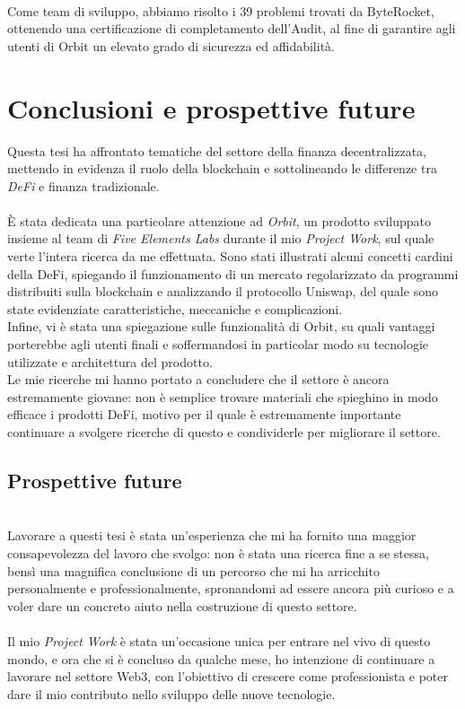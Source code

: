 \documentclass[12pt,a4paper]{report}
\begin{document}
\noindent \\Come team di sviluppo, abbiamo risolto i 39 problemi trovati da ByteRocket, ottenendo una certificazione di completamento dell'Audit, al fine di garantire agli utenti di Orbit un elevato grado di sicurezza ed affidabilità.


\chapter{Conclusioni e prospettive future}

Questa tesi ha affrontato tematiche del settore della finanza decentralizzata, mettendo in evidenza il ruolo della blockchain e sottolineando le differenze tra \textit{DeFi} e finanza tradizionale.\\\\È stata dedicata una particolare attenzione ad \textit{Orbit}, un prodotto sviluppato insieme al team di \textit{Five Elements Labs} durante il mio \textit{Project Work}, sul quale verte l'intera ricerca da me effettuata. Sono stati illustrati alcuni concetti cardini della DeFi, spiegando il funzionamento di un mercato regolarizzato da programmi distribuiti sulla blockchain e analizzando il protocollo Uniswap, del quale sono state evidenziate caratteristiche, meccaniche e complicazioni.
\\Infine, vi è stata una spiegazione sulle funzionalità di Orbit, su quali vantaggi porterebbe agli utenti finali e soffermandosi in particolar modo su tecnologie utilizzate e architettura del prodotto.
\\Le mie ricerche mi hanno portato a concludere che il settore è ancora estremamente giovane: non è semplice trovare materiali che spieghino in modo efficace i prodotti DeFi, motivo per il quale è estremamente importante continuare a svolgere ricerche di questo e condividerle per migliorare il settore.

\section{Prospettive future}
\\Lavorare a questi tesi è stata un'esperienza che mi ha fornito una maggior consapevolezza del lavoro che svolgo: non è stata una ricerca fine a se stessa, bensì una magnifica conclusione di un percorso che mi ha arricchito personalmente e professionalmente, spronandomi ad essere ancora più curioso e a voler dare un concreto aiuto nella costruzione di questo settore.
\\\\Il mio \textit{Project Work} è stata un'occasione unica per entrare nel vivo di questo mondo, e ora che si è concluso da qualche mese, ho intenzione di continuare a lavorare nel settore Web3, con l'obiettivo di crescere come professionista e poter dare il mio contributo nello sviluppo delle nuove tecnologie.


\nocite{mastering_ethereum}
\nocite{solidity_book}
\nocite{blockchain_book}
\nocite{js_book}
\nocite{ts_book}
\nocite{react_book}


\end{document}
